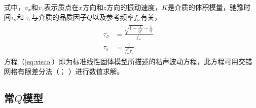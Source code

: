 式中，$v_x$和$v_z$表示质点在$x$方向和$z$方向的振动速度，$K$是介质的体积模量，驰豫时间$\tau_\sigma$和
$\tau_\epsilon$与介质的品质因子$Q$以及参考频率$f_\omega$有关，
\begin{eqnarray}
    \begin{aligned}
        \tau_\sigma &= \frac{\sqrt{1+\frac{1}{Q^2}}-\frac{1}{Q}}{f_\omega}\\
        \tau_\epsilon &= \frac{1}{f_\omega^2\tau_\sigma}.
    \end{aligned}
\end{eqnarray}
方程（\ref{eq:visco}）即为标准线性固体模型所描述的粘声波动方程，此方程可用交错网格有限差分法（；
）进行数值求解。

\vspace{1.3em}
\subsection{常$Q$模型}
\vspace{0.3em}

